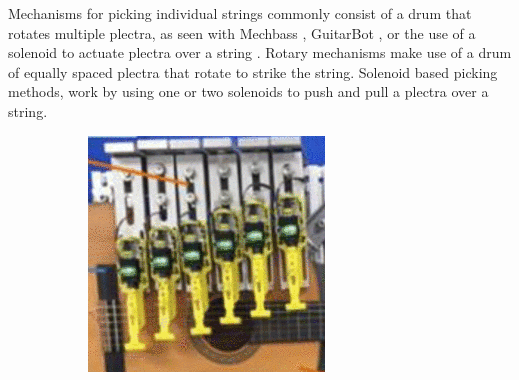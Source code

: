 \documentclass[12pt, a4paper, onecolumn]{IEEEtran}
\begin{document}
        
        Mechanisms for picking individual strings commonly consist of a drum that rotates multiple plectra, as seen with Mechbass \cite{VUW_Chordophones}, GuitarBot \cite{GuitarBot}, or the use of a solenoid to actuate plectra over a string \cite{PWM_Solenoid,Silent_Picking,Pivot_Picking}. 
        Rotary mechanisms make use of a drum of equally spaced plectra that rotate to strike the string.
        Solenoid based picking methods, work by using one or two solenoids to push and pull a plectra over a string.
        
        \begin{figure}[!h]
            \centering
            \begin{subfigure}{0.2\textwidth}
                \includegraphics[width=\columnwidth]{silent_picking.png}
                \label{fig:silent_picking}
            \end{subfigure}
            \begin{subfigure}{0.3\textwidth}

\end{subfigure}
\end{figure}
\end{document}
